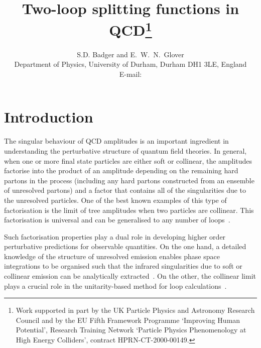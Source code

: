 \documentclass[paper,notoc,nohyper]{JHEP3}
\title{\boldmath 
Two-loop splitting functions in QCD\footnote{Work supported in part by the UK Particle Physics and Astronomy 
Research Council and by the EU Fifth Framework Programme `Improving Human
Potential', Research Training Network `Particle Physics Phenomenology 
at High Energy Colliders', contract HPRN-CT-2000-00149.}
}
\author{
S.D. Badger  and E.~W.~N.~Glover  \\
Department of Physics,
University of Durham,
Durham DH1 3LE,
England\\
E-mail:  \email{S.D.Badger@durham.ac.uk, E.W.N.Glover@durham.ac.uk}}
\begin{document}
\section{Introduction}
\label{sec:intro}

The singular behaviour of QCD amplitudes is an important ingredient in
understanding the perturbative structure of quantum field theories.   In
general, when one or more final state particles are either soft or collinear,
the amplitudes factorise into the product of an amplitude depending on the
remaining hard partons in the process (including any hard partons constructed
from an ensemble of unresolved partons) and a factor that contains all of the
singularities due to the unresolved particles.   One of the best known
examples of this type of factorisation is the limit of tree amplitudes when
two particles are collinear.  This factorisation is universal and can be
generalised to any number of loops~\cite{Kosower:allorderfact}.

Such factorisation properties play a dual role in developing higher order
perturbative predictions for observable quantities. On the one hand, a
detailed knowledge of the structure of unresolved emission enables phase space
integrations to be organised such that the infrared singularities due to soft
or collinear emission can be analytically 
extracted~\cite{Giele:1992vf,Frixione:1996ms,Catani:1997vz}.   On the other, the
collinear limit plays a crucial role in the unitarity-based method for loop
calculations~\cite{Bern:split1e0,Bern:1995cg,Bern:1996db,Bern:1996je}.
\end{document}
